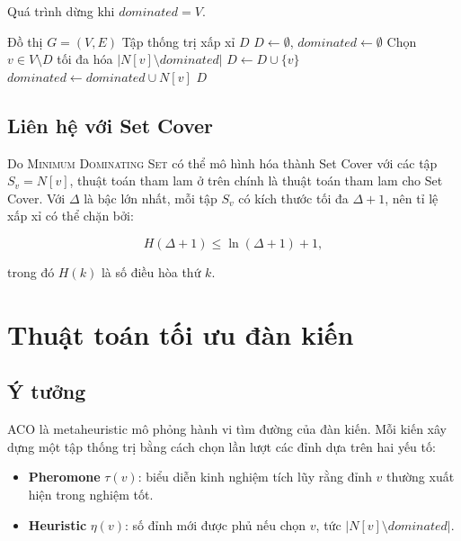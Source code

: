 \documentclass[12pt, a4paper]{report}
\newcommand{\MDS}{\textsc{Minimum Dominating Set}}
\begin{document}
Quá trình dừng khi $dominated=V$.

\begin{algorithm}[H]
\caption{Thuật toán tham lam cho bài toán \MDS{}}
\begin{algorithmic}[1]
\Require Đồ thị $G=(V,E)$
\Ensure Tập thống trị xấp xỉ $D$
\State $D \gets \emptyset$, $dominated \gets \emptyset$
  \State Chọn $v \in V\setminus D$ tối đa hóa $|N[v]\setminus dominated|$
  \State $D \gets D\cup\{v\}$
  \State $dominated \gets dominated\cup N[v]$
\EndWhile
\State \Return $D$
\end{algorithmic}
\end{algorithm}

\subsection{Liên hệ với Set Cover}

Do \MDS{} có thể mô hình hóa thành Set Cover với các tập $S_v=N[v]$, thuật toán tham lam ở trên chính
là thuật toán tham lam cho Set Cover. Với $\Delta$ là bậc lớn nhất, mỗi tập $S_v$ có kích thước tối đa
$\Delta+1$, nên tỉ lệ xấp xỉ có thể chặn bởi:

\begin{equation}
  H(\Delta+1) \leq \ln(\Delta+1)+1,
\end{equation}

trong đó $H(k)$ là số điều hòa thứ $k$.

\section{Thuật toán tối ưu đàn kiến}

\subsection{Ý tưởng}

ACO là metaheuristic mô phỏng hành vi tìm đường của đàn kiến. Mỗi kiến xây dựng một tập thống trị bằng
cách chọn lần lượt các đỉnh dựa trên hai yếu tố:

\begin{itemize}
  \item \textbf{Pheromone} $\tau(v)$: biểu diễn kinh nghiệm tích lũy rằng đỉnh $v$ thường xuất hiện trong
    nghiệm tốt.
  \item \textbf{Heuristic} $\eta(v)$: số đỉnh mới được phủ nếu chọn $v$, tức $|N[v]\setminus dominated|$.
\end{itemize}
\end{document}
